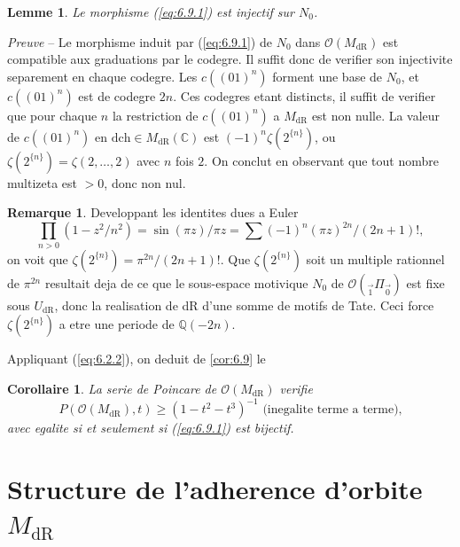 \documentclass[11pt,a4paper]{article}
\theoremstyle{plain}
\newtheorem{lemma}[theorem]{Lemme}
\newtheorem{corollary}[theorem]{Corollaire}
\theoremstyle{definition}
\newtheorem{remark}[theorem]{Remarque}
\newcommand{\Q}{\mathbb{Q}}
\newcommand{\C}{\mathbb{C}}
\newcommand{\dR}{\mathrm{dR}}
\begin{document}
\begin{lemma}\label{lem:6.11}
Le morphisme (\ref{eq:6.9.1}) est injectif sur $N_0$.
\end{lemma}

\noindent \textit{Preuve} -- Le morphisme induit par (\ref{eq:6.9.1}) de $N_0$ dans $\mathcal{O}(M_{\dR})$ est compatible aux graduations par le codegre. Il suffit donc de verifier son injectivite separement en chaque codegre. Les $c((01)^n)$ forment une base de $N_0$, et $c((01)^n)$ est de codegre $2n$. Ces codegres etant distincts, il suffit de verifier que pour chaque $n$ la restriction de $c((01)^n)$ a $M_{\dR}$ est non nulle. La valeur de $c((01)^n)$ en $\mathrm{dch} \in M_{\dR}(\C)$ est $(-1)^n \zeta(2^{\{n\}})$, ou $\zeta(2^{\{n\}}) = \zeta(2,\ldots,2)$ avec $n$ fois $2$. On conclut en observant que tout nombre multizeta est $> 0$, donc non nul.

\begin{remark}\label{rem:6.12}
Developpant les identites dues a Euler
\[
\prod_{n>0} (1 - z^2/n^2) = \sin(\pi z)/\pi z = \sum (-1)^n (\pi z)^{2n}/(2n+1)!,
\]
on voit que $\zeta(2^{\{n\}}) = \pi^{2n}/(2n+1)!$. Que $\zeta(2^{\{n\}})$ soit un multiple rationnel de $\pi^{2n}$ resultait deja de ce que le sous-espace motivique $N_0$ de $\mathcal{O}({}_{\vec{1}}\Pi_{\vec{0}})$ est fixe sous $U_{\dR}$, donc la realisation de dR d'une somme de motifs de Tate. Ceci force $\zeta(2^{\{n\}})$ a etre une periode de $\Q(-2n)$.
\end{remark}

Appliquant (\ref{eq:6.2.2}), on deduit de \ref{cor:6.9} le

\begin{corollary}\label{cor:6.10}
La serie de Poincare de $\mathcal{O}(M_{\dR})$ verifie
\begin{equation}\label{eq:6.10.1}
P(\mathcal{O}(M_{\dR}),t) \geq (1 - t^2 - t^3)^{-1} \text{ (inegalite terme a terme),}
\end{equation}
avec egalite si et seulement si (\ref{eq:6.9.1}) est bijectif.
\end{corollary}

\section{Structure de l'adherence d'orbite $M_{\dR}$}\label{sec:7}

\subsection{}\label{ssec:7.1}
\end{document}
